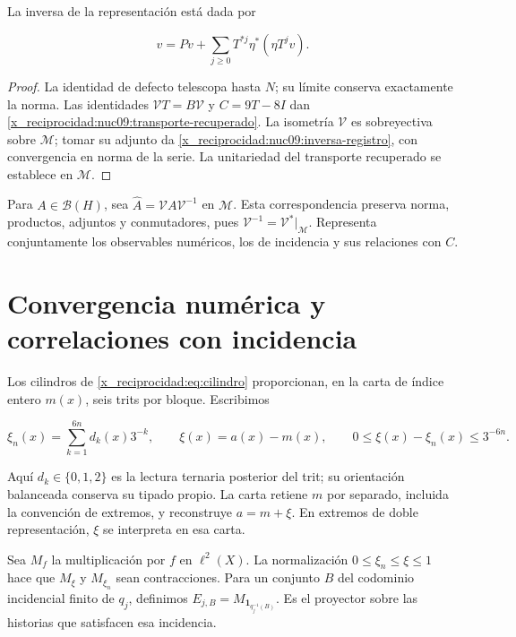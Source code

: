 La inversa de la representación está dada por



\begin{equation}
v=Pv+\sum_{j\ge0}T^{*j}\eta^*(\eta T^jv).
\label{x_reciprocidad:nuc09:inversa-registro}
\end{equation}



\begin{proof}
La identidad de defecto telescopa hasta \(N\); su límite conserva
exactamente la norma. Las identidades
\(\mathcal VT=B\mathcal V\) y \(C=9T-8I\) dan
\eqref{x_reciprocidad:nuc09:transporte-recuperado}.
La isometría \(\mathcal V\) es sobreyectiva sobre \(\mathcal M\);
tomar su adjunto da \eqref{x_reciprocidad:nuc09:inversa-registro}, con convergencia
en norma de la serie. La unitariedad del transporte recuperado
se establece en \(\mathcal M\).
\end{proof}

Para \(A\in\mathcal B(H)\), sea
\(\widehat A=\mathcal VA\mathcal V^{-1}\) en \(\mathcal M\).
Esta correspondencia preserva norma, productos, adjuntos y conmutadores,
pues \(\mathcal V^{-1}=\mathcal V^*|_{\mathcal M}\).
Representa conjuntamente los observables numéricos, los de incidencia
y sus relaciones con \(C\).

\section{Convergencia numérica y correlaciones con incidencia}

Los cilindros de \eqref{x_reciprocidad:eq:cilindro} proporcionan, en la carta de
índice entero \(m(x)\), seis trits por bloque. Escribimos



\[
\xi_n(x)=\sum_{k=1}^{6n}d_k(x)3^{-k},\qquad
\xi(x)=a(x)-m(x),\qquad 0\le\xi(x)-\xi_n(x)\le3^{-6n}.
\]



Aquí \(d_k\in\{0,1,2\}\) es la lectura ternaria posterior del trit;
su orientación balanceada conserva su tipado propio. La carta
retiene \(m\) por separado, incluida la convención de extremos,
y reconstruye \(a=m+\xi\). En extremos de doble representación,
\(\xi\) se interpreta en esa carta.

Sea \(M_f\) la multiplicación por \(f\) en \(\ell^2(X)\).
La normalización \(0\le\xi_n\le\xi\le1\) hace que
\(M_\xi\) y \(M_{\xi_n}\) sean contracciones.
Para un conjunto \(B\) del codominio incidencial finito de \(q_j\),
definimos
\(E_{j,B}=M_{\mathbf1_{q_j^{-1}(B)}}\).
Es el proyector sobre las historias que satisfacen esa incidencia.

